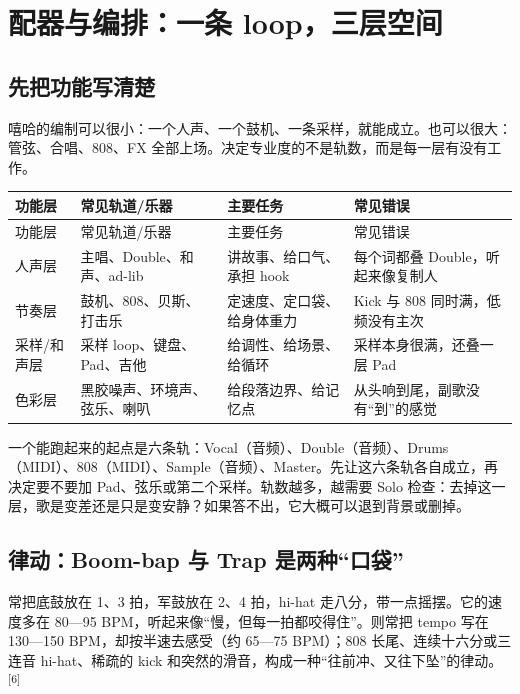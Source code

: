 \section{配器与编排：一条 loop，三层空间}
\label{sec:hiphop-craft}

\subsection{先把功能写清楚}
\label{sec:hiphop-instrumentation}

嘻哈的编制可以很小：一个人声、一个鼓机、一条采样，就能成立。也可以很大：管弦、合唱、808、FX 全部上场。决定专业度的不是轨数，而是每一层有没有工作。

\begin{longtable}{p{}p{}p{}p{}}
\toprule
功能层 & 常见轨道/乐器 & 主要任务 & 常见错误 \\
\midrule
\endfirsthead
\toprule
功能层 & 常见轨道/乐器 & 主要任务 & 常见错误 \\
\midrule
\endhead
人声层 & 主唱、Double、和声、ad-lib & 讲故事、给口气、承担 hook & 每个词都叠 Double，听起来像复制人 \\
节奏层 & 鼓机、808、贝斯、打击乐 & 定速度、定口袋、给身体重力 & Kick 与 808 同时满，低频没有主次 \\
采样/和声层 & 采样 loop、键盘、Pad、吉他 & 给调性、给场景、给循环 & 采样本身很满，还叠一层 Pad \\
色彩层 & 黑胶噪声、环境声、弦乐、喇叭 & 给段落边界、给记忆点 & 从头响到尾，副歌没有“到”的感觉 \\
\bottomrule
\end{longtable}

一个能跑起来的起点是六条轨：Vocal（音频）、Double（音频）、Drums（MIDI）、808（MIDI）、Sample（音频）、Master。先让这六条轨各自成立，再决定要不要加 Pad、弦乐或第二个采样。轨数越多，越需要 Solo 检查：去掉这一层，歌是变差还是只是变安静？如果答不出，它大概可以退到背景或删掉。

\subsection{律动：Boom-bap 与 Trap 是两种“口袋”}
\label{sec:hiphop-groove}

常把底鼓放在 1、3 拍，军鼓放在 2、4 拍，hi-hat 走八分，带一点摇摆。它的速度多在 80—95 BPM，听起来像“慢，但每一拍都咬得住”。则常把 tempo 写在 130—150 BPM，却按半速去感受（约 65—75 BPM）；808 长尾、连续十六分或三连音 hi-hat、稀疏的 kick 和突然的滑音，构成一种“往前冲、又往下坠”的律动。{\textsuperscript{[6]}}

